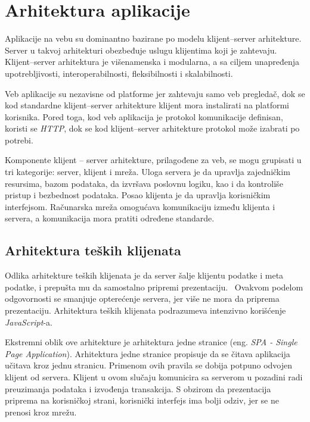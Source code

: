 \section{Arhitektura aplikacije}\label{ch:arhitektura}

Aplikacije na vebu su dominantno bazirane po modelu klijent--server arhitekture. 
Server u takvoj arhitekturi obezbeđuje uslugu klijentima koji je zahtevaju. Klijent--server 
arhitektura je višenamenska i modularna, a sa ciljem unapređenja upotrebljivosti, interoperabilnosti, 
fleksibilnosti i skalabilnosti. 

Veb aplikacije su nezavisne od platforme jer zahtevaju samo veb pregledač, dok se kod standardne 
klijent--server arhitekture klijent mora instalirati na platformi korisnika. Pored toga, 
kod veb aplikacija je protokol komunikacije definisan, koristi se \textit{HTTP}, dok se kod klijent--server
arhitekture protokol može izabrati po potrebi.

Komponente klijent -- server arhitekture, prilagođene za veb, se mogu grupisati u tri kategorije: 
server, klijent i mreža. Uloga servera je da upravlja zajedničkim resursima, bazom podataka, da 
izvršava poslovnu logiku, kao i da kontroliše pristup i bezbednost podataka. Posao klijenta je da 
upravlja korisničkim interfejsom. Računarska mreža omogućava komunikaciju između klijenta i servera, 
a komunikacija mora pratiti određene standarde.

\subsection{Arhitektura teških klijenata}\label{sec:arhitektura-spa}

Odlika arhitekture teških klijenata je da server šalje klijentu podatke i meta podatke, i prepušta 
mu da samostalno pripremi prezentaciju.~\cite{PVEB} Ovakvom podelom odgovornosti se smanjuje opterećenje 
servera, jer više ne mora da priprema prezentaciju. Arhitektura teških klijenata podrazumeva intenzivno 
korišćenje \textit{JavaScript}-a.

Ekstremni oblik ove arhitekture je arhitektura jedne stranice (eng. \textit{SPA - Single Page Application}).
Arhitektura jedne stranice propisuje da se čitava aplikacija učitava kroz jednu stranicu. Primenom 
ovih pravila se dobija potpuno odvojen klijent od servera. Klijent u ovom slučaju komunicira 
sa serverom u pozadini radi preuzimanja podataka i izvođenja transakcija. S obzirom da prezentacija
priprema na korisničkoj strani, korisnički interfejs ima bolji odziv, jer se ne prenosi kroz mrežu.

